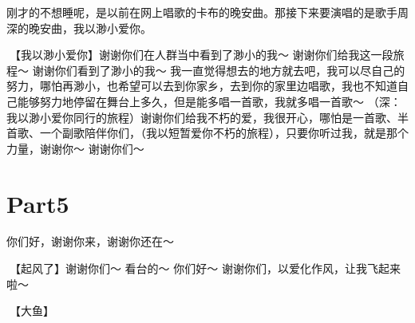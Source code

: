 \documentclass[
]{book}
\begin{document}
刚才的不想睡呢，是以前在网上唱歌的卡布的晚安曲。那接下来要演唱的是歌手周深的晚安曲，我以渺小爱你。

🎵【我以渺小爱你】谢谢你们在人群当中看到了渺小的我～ 谢谢你们给我这一段旅程～ 谢谢你们看到了渺小的我～
我一直觉得想去的地方就去吧，我可以尽自己的努力，哪怕再渺小，也希望可以去到你家乡，去到你的家里边唱歌，我也不知道自己能够努力地停留在舞台上多久，但是能多唱一首歌，我就多唱一首歌～ （深：我以渺小爱你同行的旅程）谢谢你们给我不朽的爱，我很开心，哪怕是一首歌、半首歌、一个副歌陪伴你们，（我以短暂爱你不朽的旅程），只要你听过我，就是那个力量，谢谢你～ 谢谢你们～

\section{Part5}\label{hangzhou-20240824-part5}

你们好，谢谢你来，谢谢你还在～

🎵【起风了】谢谢你们～ 看台的～ 你们好～ 谢谢你们，以爱化作风，让我飞起来啦～

🎵【大鱼】
\end{document}
